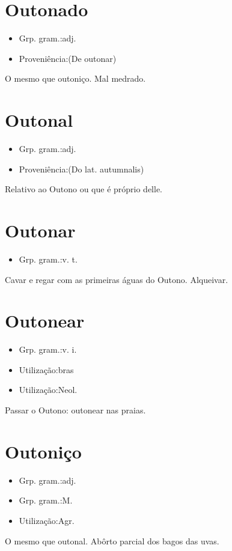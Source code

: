 \section{Outonado}
\begin{itemize}
\item {Grp. gram.:adj.}
\end{itemize}
\begin{itemize}
\item {Proveniência:(De \textunderscore outonar\textunderscore )}
\end{itemize}
O mesmo que \textunderscore outoniço\textunderscore .
Mal medrado.
\section{Outonal}
\begin{itemize}
\item {Grp. gram.:adj.}
\end{itemize}
\begin{itemize}
\item {Proveniência:(Do lat. \textunderscore autumnalis\textunderscore )}
\end{itemize}
Relativo ao Outono ou que é próprio delle.
\section{Outonar}
\begin{itemize}
\item {Grp. gram.:v. t.}
\end{itemize}
Cavar e regar com as primeiras águas do Outono.
Alqueivar.
\section{Outonear}
\begin{itemize}
\item {Grp. gram.:v. i.}
\end{itemize}
\begin{itemize}
\item {Utilização:bras}
\end{itemize}
\begin{itemize}
\item {Utilização:Neol.}
\end{itemize}
Passar o Outono: \textunderscore outonear nas praias\textunderscore .
\section{Outoniço}
\begin{itemize}
\item {Grp. gram.:adj.}
\end{itemize}
\begin{itemize}
\item {Grp. gram.:M.}
\end{itemize}
\begin{itemize}
\item {Utilização:Agr.}
\end{itemize}
O mesmo que \textunderscore outonal\textunderscore .
Abôrto parcial dos bagos das uvas.
